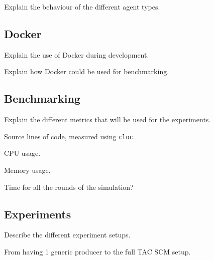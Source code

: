 Explain the behaviour of the different agent types.

\subsection{Docker}

Explain the use of Docker during development.

Explain how Docker could be used for benchmarking.

\subsection{Benchmarking}

Explain the different metrics that will be used for the experiments.

Source lines of code, measured using \verb|cloc|.

CPU usage.

Memory usage.

Time for all the rounds of the simulation?

\subsection{Experiments}

Describe the different experiment setups.

From having 1 generic producer to the full TAC SCM setup.

